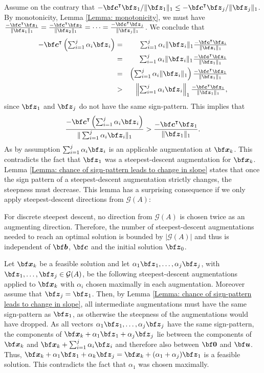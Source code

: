 \documentclass[moor]{informs1hack}              %
\def\Graver{{\mathcal G}}
\def\ve#1{\mathchoice{\mbox{\boldmath$\displaystyle\bf#1$}}
{\mbox{\boldmath$\textstyle\bf#1$}}
{\mbox{\boldmath$\scriptstyle\bf#1$}}
{\mbox{\boldmath$\scriptscriptstyle\bf#1$}}}
\newcommand\veb{{\ve b}}
\newcommand\vecc{{\ve c}}
\newcommand\veu{{\ve u}}
\newcommand\vex{{\ve x}}
\newcommand\vez{{\ve z}}
\newcommand{\T}{{\intercal}} %
\begin{document}
  Assume on the contrary that $-\vecc^\T\vez_1/\|\vez_1\|_1 \leq -\vecc^\T\vez_j/\|\vez_j\|_1$. By monotonicity, Lemma \ref{Lemma: monotonicity}, we must have $\frac{-\vecc^\T\vez_1}{\|\vez_1\|_1}=\frac{-\vecc^\T\vez_2}{\|\vez_2\|_1}=\dots=\frac{-\vecc^\T\vez_j}{\|\vez_j\|_1}$. We conclude that
  \begin{eqnarray*}
    -\vecc^\T\textstyle\left(\sum_{i=1}^j\alpha_i\vez_i\right) & = & \textstyle\sum_{i=1}^j\alpha_i\|\vez_i\|_1\frac{-\vecc^\T\vez_i}{\|\vez_i\|_1}\\
    & = & \textstyle\sum_{i=1}^j\alpha_i\|\vez_i\|_1\frac{-\vecc^\T\vez_1}{\|\vez_1\|_1}\\
    & = & \textstyle\left(\sum_{i=1}^j\alpha_i\|\vez_i\|_1\right)\frac{-\vecc^\T\vez_1}{\|\vez_1\|_1}\\
    & > & \textstyle\left\|\sum_{i=1}^j\alpha_i\vez_i\right\|_1\frac{-\vecc^\T\vez_1}{\|\vez_1\|_1},
  \end{eqnarray*}
  since $\vez_1$ and $\vez_j$ do not have the same sign-pattern. This implies that
  \[
    \frac{-\vecc^\T\textstyle\left(\sum_{i=1}^j\alpha_i\vez_i\right)}{\|\sum_{i=1}^j\alpha_i\vez_i\|_1}>\frac{-\vecc^\T\vez_1}{\|\vez_1\|_1}.
  \]
  As by assumption $\sum_{i=1}^j\alpha_i\vez_i$ is an applicable augmentation at $\vex_k$. This contradicts the fact that $\vez_1$ was a steepest-descent augmentation for $\vex_k$.
 \Halmos
\endproof
Lemma \ref{Lemma: chance of sign-pattern leads to change in slope} states that once the sign pattern
of a steepest-descent augmentation strictly changes, the steepness must decrease.
This lemma has a surprising consequence if we only apply steepest-descent directions from $\Graver(A)$:

\begin{corollary}\label{Corollary: number of augmentations bounded by size of Graver basis}
For discrete steepest descent, no direction from $\Graver(A)$ is chosen twice as an augmenting direction. Therefore, the number of steepest-descent augmentations needed to reach an optimal solution is bounded by $|\Graver(A)|$ and thus is independent of $\veb$, $\vecc$ and the initial solution $\vez_0$.
\end{corollary}

  Let $\vex_k$ be a feasible solution and let $\alpha_1\vez_1,\ldots,\alpha_j\vez_j$, with $\vez_1,\ldots,\vez_j\in\Graver(A)$, be the following steepest-descent augmentations applied to $\vex_k$ with $\alpha_i$ chosen maximally in each augmentation. Moreover assume that $\vez_j=\vez_1$. Then, by Lemma \ref{Lemma: chance of sign-pattern leads to change in slope}, all intermediate augmentations must have the same sign-pattern as $\vez_1$, as otherwise the steepness of the augmentations would have dropped. As all vectors $\alpha_1\vez_1,\ldots,\alpha_j\vez_j$ have the same sign-pattern, the components of $\vex_k+\alpha_1\vez_1+\alpha_j\vez_j$ lie between the components of $\vex_k$ and $\vex_k+\sum_{i=1}^j\alpha_i\vez_i$ and therefore also between $\ve 0$ and $\veu$. Thus, $\vex_k+\alpha_1\vez_1+\alpha_k\vez_j=\vex_k+(\alpha_1+\alpha_j)\vez_1$ is a feasible solution. This contradicts the fact that $\alpha_1$ was chosen maximally.
 \Halmos
\endproof
\end{document}
